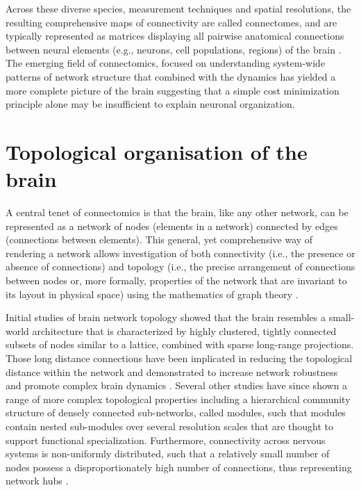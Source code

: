 Across these diverse species, measurement techniques and spatial resolutions, the resulting comprehensive maps of connectivity are called connectomes, and are typically represented as matrices displaying all pairwise anatomical connections between neural elements (e.g., neurons, cell populations, regions) of the brain \citep{Sporns2005}. The emerging field of connectomics, focused on understanding system-wide patterns of network structure that combined with the dynamics has yielded a more complete picture of the brain suggesting that a simple cost minimization principle alone may be insufficient to explain neuronal organization.

\section{Topological organisation of the brain}

A central tenet of connectomics is that the brain, like any other network, can be represented as a network of nodes (elements in a network) connected by edges (connections between elements). This general, yet comprehensive way of rendering a network allows investigation of both connectivity (i.e., the presence or absence of connections) and topology (i.e., the precise arrangement of connections between nodes or, more formally, properties of the network that are invariant to its layout in physical space) using the mathematics of graph theory \citep{Barabasi2016}.

Initial studies of brain network topology showed that the brain resembles a small-world architecture \citep{Bassett2006,Gygi1999,Hilgetag2004,Sporns2004,Watts1998} that is characterized by highly clustered, tightly connected subsets of nodes similar to a lattice, combined with sparse long-range projections. Those long distance connections have been implicated in reducing the topological distance within the network \citep{Bullmore2012,Sporns2004,VandenHeuvel2011} and demonstrated to increase network robustness and promote complex brain dynamics \citep{Betzel2018}. Several other studies have since shown a range of more complex topological properties including a hierarchical community structure of densely connected sub-networks, called modules, such that modules contain nested sub-modules over several resolution scales \citep{Bullmore1997,Meunier2010a,Towlson2013} that are thought to support functional specialization. Furthermore, connectivity across nervous systems is non-uniformly distributed, such that a relatively small number of nodes possess a disproportionately high number of connections, thus representing network hubs
\citep{Towlson2013,VandenHeuvel2011}.

